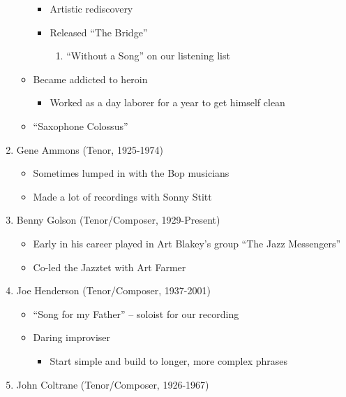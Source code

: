 \documentclass[]{article}
\providecommand{\tightlist}{%
  \setlength{\itemsep}{0pt}\setlength{\parskip}{0pt}}
\begin{document}
\begin{enumerate}
\begin{itemize}
    \begin{itemize}
    \tightlist
    \item
      Artistic rediscovery
    \item
      Released ``The Bridge''

      \begin{enumerate}
      \def\labelenumii{\roman{enumii}.}
      \tightlist
      \item
        ``Without a Song'' on our listening list
      \end{enumerate}
    \end{itemize}
  \item
    Became addicted to heroin

    \begin{itemize}
    \tightlist
    \item
      Worked as a day laborer for a year to get himself clean
    \end{itemize}
  \item
    ``Saxophone Colossus''
  \end{itemize}
\item
  Gene Ammons (Tenor, 1925-1974)

  \begin{itemize}
  \tightlist
  \item
    Sometimes lumped in with the Bop musicians
  \item
    Made a lot of recordings with Sonny Stitt
  \end{itemize}
\item
  Benny Golson (Tenor/Composer, 1929-Present)

  \begin{itemize}
  \tightlist
  \item
    Early in his career played in Art Blakey's group ``The Jazz
    Messengers''
  \item
    Co-led the Jazztet with Art Farmer
  \end{itemize}
\item
  Joe Henderson (Tenor/Composer, 1937-2001)

  \begin{itemize}
  \tightlist
  \item
    ``Song for my Father'' -- soloist for our recording
  \item
    Daring improviser

    \begin{itemize}
    \tightlist
    \item
      Start simple and build to longer, more complex phrases
    \end{itemize}
  \end{itemize}
\item
  John Coltrane (Tenor/Composer, 1926-1967)


\end{enumerate}
\end{document}
